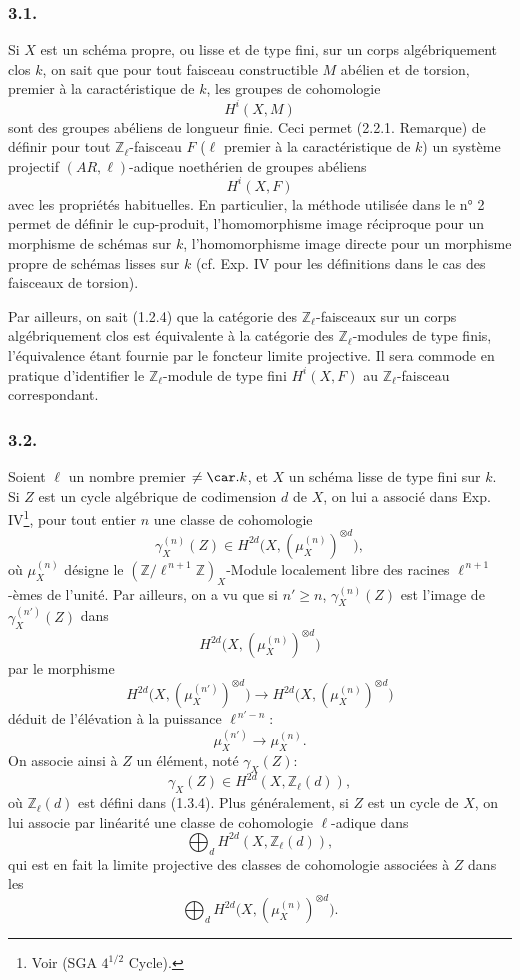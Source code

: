 \subsubsection*{3.1.}
Si \(X\) est un schéma propre, ou lisse et de type fini, sur un corps algébriquement clos \(k\), on sait que pour tout faisceau constructible \(M\) abélien et de torsion, premier à la caractéristique de \(k\), les groupes de cohomologie
\[
H^i(X,M)
\]
sont des groupes abéliens de longueur finie. Ceci permet (2.2.1. Remarque) de définir pour tout \(\mathbb{Z}_\ell\)-faisceau \(F\) (\(\ell\) premier à la caractéristique de \(k\)) un système projectif \((AR,\ell)\)-adique noethérien de groupes abéliens
\[
H^i(X,F)
\]
avec les propriétés habituelles. En particulier, la méthode utilisée dans le n° 2 permet de définir le cup-produit, l'homomorphisme image réciproque pour un morphisme de schémas sur \(k\), l'homomorphisme image directe pour un morphisme propre de schémas lisses sur \(k\) (cf. Exp. IV pour les définitions dans le cas des faisceaux de torsion).

Par ailleurs, on sait (1.2.4) que la catégorie des \(\mathbb{Z}_\ell\)-faisceaux sur un corps algébriquement clos est équivalente à la catégorie des \(\mathbb{Z}_\ell\)-modules de type finis, l'équivalence étant fournie par le foncteur limite projective. Il sera commode en pratique d'identifier le \(\mathbb{Z}_\ell\)-module de type fini \(H^i(X,F)\) au \(\mathbb{Z}_\ell\)-faisceau correspondant.

\subsubsection*{3.2.}
Soient \(\ell\) un nombre premier \(\ne\car.k\), et \(X\) un schéma lisse de type fini sur \(k\). Si \(Z\) est un cycle algébrique de codimension \(d\) de \(X\), on lui a associé dans Exp. IV\footnote{Voir (SGA \(4^{1/2}\) Cycle).}, pour tout entier \(n\) une classe de cohomologie
\[
\gamma_X^{(n)}(Z)\in H^{2d}\bigl(X,(\mu_X^{(n)})^{\otimes d}\bigr),
\]
où \(\mu_X^{(n)}\) désigne le \((\mathbb{Z}/\ell^{\,n+1}\mathbb{Z})_X\)-Module localement libre des racines \(\ell^{\,n+1}\)-èmes de l'unité. Par ailleurs, on a vu que si \(n'\ge n\), \(\gamma_X^{(n)}(Z)\) est l'image de \(\gamma_X^{(n')}(Z)\) dans
\[
H^{2d}\bigl(X,(\mu_X^{(n)})^{\otimes d}\bigr)
\]
par le morphisme
\[
H^{2d}\bigl(X,(\mu_X^{(n')})^{\otimes d}\bigr)
\longrightarrow
H^{2d}\bigl(X,(\mu_X^{(n)})^{\otimes d}\bigr)
\]
déduit de l'élévation à la puissance \(\ell^{\,n'-n}\):
\[
\mu_X^{(n')}\longrightarrow \mu_X^{(n)}.
\]
On associe ainsi à \(Z\) un élément, noté \(\gamma_X(Z)\):
\[
\gamma_X(Z)\in H^{2d}(X,\mathbb{Z}_\ell(d)),
\]
où \(\mathbb{Z}_\ell(d)\) est défini dans (1.3.4). Plus généralement, si \(Z\) est un cycle de \(X\), on lui associe par linéarité une classe de cohomologie \(\ell\)-adique dans
\[
\bigoplus_d H^{2d}(X,\mathbb{Z}_\ell(d)),
\]
qui est en fait la limite projective des classes de cohomologie associées à \(Z\) dans les
\[
\bigoplus_d H^{2d}\bigl(X,(\mu_X^{(n)})^{\otimes d}\bigr).
\]

